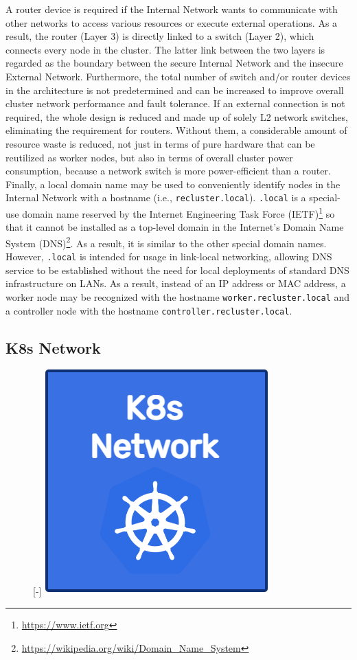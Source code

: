 A router device is required if the Internal Network wants to communicate with
other networks to access various resources or execute external operations. As a result,
the router (Layer 3) is directly linked to a switch (Layer 2), which connects every
node in the cluster. The latter link between the two layers is regarded as the
boundary between the secure Internal Network and the insecure External Network. Furthermore,
the total number of switch and/or router devices in the architecture is not
predetermined and can be increased to improve overall cluster network
performance and fault tolerance. If an external connection is not required, the
whole design is reduced and made up of solely L2 network switches, eliminating the
requirement for routers. Without them, a considerable amount of resource waste is
reduced, not just in terms of pure hardware that can be reutilized as worker
nodes, but also in terms of overall cluster power consumption, because a network
switch is more power-efficient than a router\cite{switch_vs_router_power_consumption}.
\\ %
Finally, a local domain name may be used to conveniently identify nodes in the
Internal Network with a hostname (i.e., \texttt{recluster.local}). \texttt{.local}
is a special-use domain name reserved by the Internet Engineering Task Force (IETF)\footnote{\url{https://www.ietf.org}}
so that it cannot be installed as a top-level domain in the Internet's Domain
Name System (DNS)\footnote{\url{https://wikipedia.org/wiki/Domain_Name_System}}.
As a result, it is similar to the other special domain names. However, \texttt{.local}
is intended for usage in link-local networking, allowing DNS service to be established
without the need for local deployments of standard DNS infrastructure on LANs\cite{local_domain_name}\cite{reserved_dns_names}.
As a result, instead of an IP address or MAC address, a worker node may be
recognized with the hostname \texttt{worker.recluster.local} and a controller node
with the hostname \texttt{controller.recluster.local}.

\subsection{K8s Network}
\label{subsec:architecture_network_k8s_network}

\begin{figure} %
  \raisebox{0pt}[\dimexpr\height-\baselineskip\relax]{\centering
  \includegraphics[width=.2\textwidth]{images/recluster/k8s_network.png}}
\end{figure}

